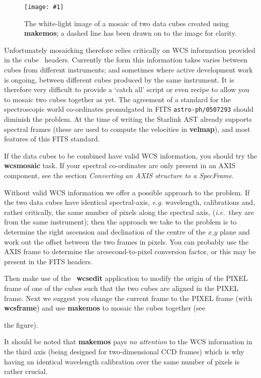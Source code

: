 \documentclass[twoside,11pt]{article}
\newcommand{\htmladdimg}[1]{}
\newcommand{\xref}[3]{#1}
\newcommand{\myfig} [5] {
  \begin{figure}
    \centering\texttt{[image: \#1]}
    \typeout{#1 inserted on page \arabic{page}}
    \caption{\label{#4}#5}
  \end{figure}
  }
\newcommand{\myfig}[5]{
    \label{#4} \htmladdimg{#3}\\
    Figure: #5\\
    }
\begin{document}
{\myfig{sc16_mosaic.eps}{height=0.4\textheight}{sc16_mosaic.gif}{sc16_mosaic_fig}{The
white-light image of a mosaic of two data cubes created using {\bf makemos};
a dashed line has been drawn on to the image for clarity.}

Unfortunately mosaicking therefore relies critically on WCS
information provided in the cube \FITSref\ headers.  Currently the form
this information takes varies between cubes from different
instruments; and sometimes where active development work is ongoing,
between different cubes produced by the same instrument.  It is
therefore very difficult to provide a `catch all' script or even
recipe to allow you to mosaic two cubes together as yet.  The
agreement of a standard for the spectroscopic world co-ordinates
promulgated in FITS {\tt astro-ph/0507293} should diminish the problem.
At the time of writing the Starlink \xref{AST}{sun210}{} already
supports spectral frames (these are used to compute the velocities in
{\bf velmap}), and most features of this FITS standard.

If the data cubes to be combined have valid WCS information,
you should try the \xref{{\bf wcsmosaic}}{sun95}{WCSMOSAIC} task.
If your spectral co-ordinates are only present in an AXIS component,
see the section \xref{{\em Converting an AXIS structure to a
SpecFrame}}{sun95}{se_wcsuse}{}.

Without valid WCS information we offer a possible approach to the
problem.  If the two data cubes have identical spectral-axis,
\emph{e.g.} wavelength, calibrations and, rather critically, the same
number of pixels along the spectral axis, (\emph{i.e.}\ they are from
the same instrument); then the approach we take to the problem is to
determine the right ascension and declination of the centre of the
$x$,$y$ plane and work out the offset between the two frames in
pixels.  You can probably use the AXIS frame to determine the
arcsecond-to-pixel conversion factor, or this may be present in the
FITS headers.

Then make use of the \CCDPACK\ \xref{{\bf wcsedit}}{sun139}{WCSEDIT}
application to modify the origin of the PIXEL frame of one of the
cubes such that the two cubes are aligned in the PIXEL frame.  Next
we suggest you change the current frame to the PIXEL frame (with 
\xref{{\bf wcsframe}}{sun95}{WCSFRAME}) and use
\xref{{\bf makemos}}{sun139}{MAKEMOS} to mosaic the cubes together (see
\begin{htmlonly}
the figure).
\end{htmlonly}
  It should be noted that {\bf makemos} pays
{\em no attention} to the WCS information in the third axis (being
designed for two-dimensional CCD frames) which is why having an
identical wavelength calibration over the same number of pixels is
rather crucial.

}
\end{document}
